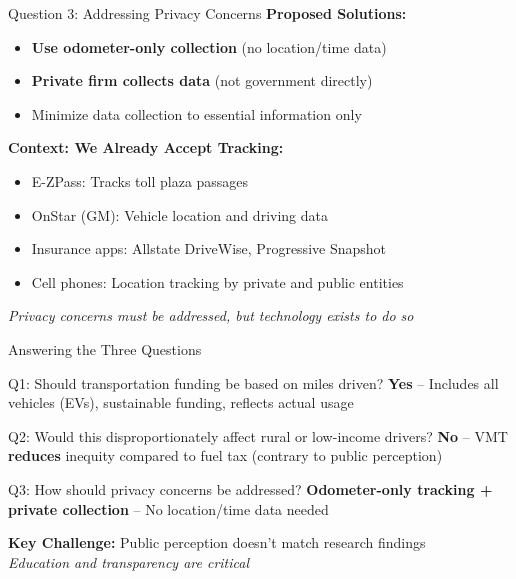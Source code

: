 \documentclass[aspectratio=169]{beamer}
\begin{document}
\begin{frame}{Question 3: Addressing Privacy Concerns}
\textbf{Proposed Solutions:}
\begin{itemize}
\item \textbf{Use odometer-only collection} (no location/time data)
\item \textbf{Private firm collects data} (not government directly)
\item Minimize data collection to essential information only
\end{itemize}

\vspace{0.5cm}
\textbf{Context: We Already Accept Tracking:}
\begin{itemize}
\item E-ZPass: Tracks toll plaza passages
\item OnStar (GM): Vehicle location and driving data
\item Insurance apps: Allstate DriveWise, Progressive Snapshot
\item Cell phones: Location tracking by private and public entities
\end{itemize}

\vspace{0.3cm}
\textit{Privacy concerns must be addressed, but technology exists to do so}
\end{frame}


\begin{frame}{Answering the Three Questions}
\begin{block}{Q1: Should transportation funding be based on miles driven?}
\textbf{Yes} -- Includes all vehicles (EVs), sustainable funding, reflects actual usage
\end{block}

\begin{block}{Q2: Would this disproportionately affect rural or low-income drivers?}
\textbf{No} -- VMT \textbf{reduces} inequity compared to fuel tax (contrary to public perception)
\end{block}

\begin{block}{Q3: How should privacy concerns be addressed?}
\textbf{Odometer-only tracking + private collection} -- No location/time data needed
\end{block}

\vspace{0.3cm}
\textbf{Key Challenge:} Public perception doesn't match research findings\\
\textit{Education and transparency are critical}
\end{frame}
\end{document}
